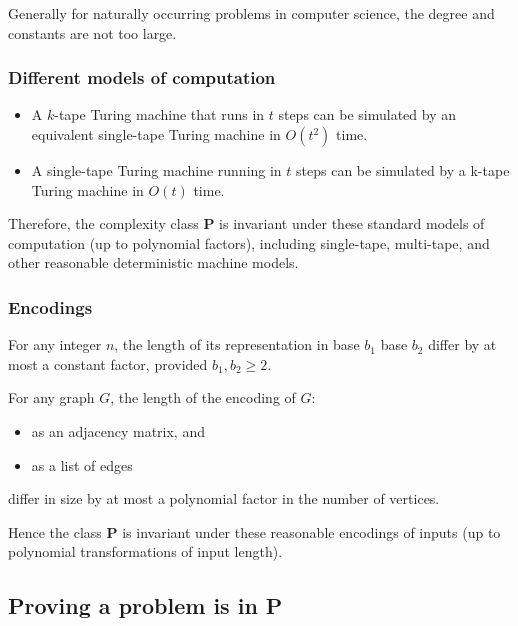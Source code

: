 \documentclass[11pt]{article}
\providecommand{\tightlist}{%
      \setlength{\itemsep}{0pt}\setlength{\parskip}{0pt}}
\begin{document}
Generally for naturally occurring problems in computer science, the
degree and constants are not too large.

    \subsubsection{Different models of
computation}\label{different-models-of-computation}

\begin{itemize}
\tightlist
\item
  A \(k\)-tape Turing machine that runs in \(t\) steps can be simulated
  by an equivalent single-tape Turing machine in \(O(t^2)\) time.
\item
  A single-tape Turing machine running in \(t\) steps can be simulated
  by a k-tape Turing machine in \(O(t)\) time.
\end{itemize}

Therefore, the complexity class \textbf{P} is invariant under these
standard models of computation (up to polynomial factors), including
single-tape, multi-tape, and other reasonable deterministic machine
models.

\subsubsection{Encodings}\label{encodings}

For any integer \(n\), the length of its representation in base \(b_1\)
base \(b_2\) differ by at most a constant factor, provided
\(b_1, b_2 \geq 2\).

For any graph \(G\), the length of the encoding of \(G\):

\begin{itemize}
\tightlist
\item
  as an adjacency matrix, and
\item
  as a list of edges
\end{itemize}

differ in size by at most a polynomial factor in the number of vertices.

Hence the class \textbf{P} is invariant under these reasonable encodings
of inputs (up to polynomial transformations of input length).

    \subsection{\texorpdfstring{Proving a problem is in
\textbf{P}}{Proving a problem is in P}}\label{proving-a-problem-is-in-p}
\end{document}
